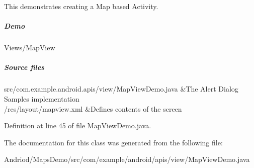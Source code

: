 This demonstrates creating a Map based Activity.

\subparagraph*{Demo}

Views/\-Map\-View

\subparagraph*{Source files}

\begin{TabularC}{2}
\hline
src/com.\-example.\-android.\-apis/view/\-Map\-View\-Demo.java &The Alert Dialog Samples implementation  \\
/res/layout/mapview.xml &Defines contents of the screen  \\
\end{TabularC}


Definition at line 45 of file Map\-View\-Demo.\-java.



The documentation for this class was generated from the following file\-:\begin{DoxyCompactItemize}
\item 
Andriod/\-Maps\-Demo/src/com/example/android/apis/view/Map\-View\-Demo.\-java\end{DoxyCompactItemize}
